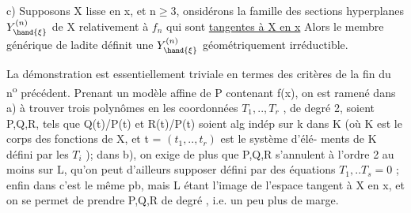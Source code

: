 c) Supposons X lisse en x,  et  n$\geq$3,   onsidérons
la famille des sections hyperplanes   $Y^{(n)}_{\hand{\xi}}$ de X relativement
à $f_n$ qui sont \uline{tangentes à X en x} Alors le membre générique de ladite
définit une $Y^{(n)}_{\hand{\xi}}$ géométriquement irréductible.

La démonstration est essentiellement triviale en termes des
critères de la fin du n\textsuperscript{o} précédent. Prenant un modèle affine de P
contenant f(x), on est ramené dans a) à trouver  trois polynômes
en les coordonnées $T_1,..,T_r$ , de degré 2, soient P,Q,R, tels que
Q(t)/P(t) et R(t)/P(t) soient alg indép sur k dans K (où K est le
corps des fonctions de X, et t = $(t_1,..,t_r)$ est le système d'élé-%
ments de K défini par les $T_i$ ); dans b), on exige de plus que P,Q,R
s'annulent à l'ordre 2 au moins sur L, qu'on peut d'ailleurs supposer
défini par des équations $T_1,..T_s = 0$ ; enfin dans  c'est le même
pb, mais L étant l'image de l'espace tangent à X en x, et on se permet
 de prendre P,Q,R  de degré  , i.e. un peu plus de marge.

